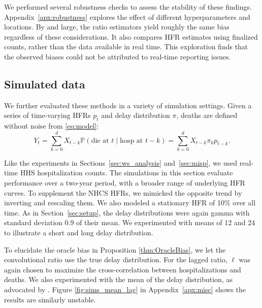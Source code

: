 \documentclass{article}
\newcommand{\given}{\; \vert \;}
\begin{document}
We performed several robustness checks to assess the stability of these findings. Appendix~\ref{apx:robustness} explores the effect of different hyperparameters and locations. By and large, the ratio estimators yield roughly the same bias regardless of these considerations. It also compares HFR estimates using finalized counts, rather than the data available in real time. This exploration finds that the observed biases could not be attributed to real-time reporting issues. 

\subsection{Simulated data}\label{sec:results_sim}

We further evaluated these methods in a variety of simulation settings. Given a series of time-varying HFRs $p_t$ and delay distribution $\pi$, deaths are defined without noise from \eqref{eq:model}:
$$Y_t = \sum_{k=0}^d X_{t-k} \mathbb{P}(\text{die at $t$}\given\text{hosp at }t-k) = \sum_{k=0}^d X_{t-k} \pi_k p_{t-k}.$$

Like the experiments in Sections~\ref{sec:ws_analysis} and~\ref{sec:misp}, we
used real-time HHS hospitalization counts. The simulations in this
section evaluate performance over a two-year period, with a broader range of
underlying HFR curves. To supplement the NHCS HFRs, we mimicked the opposite
trend by inverting and rescaling them. We also modeled a stationary HFR of 10\%
over all time. As in Section~\ref{sec:setup}, the delay distributions were again
gamma with standard deviation 0.9 of their mean. We experimented with means of
12 and 24 to illustrate a short and long delay distribution. 

To elucidate the oracle bias in Proposition \ref{thm:OracleBias}, we let the convolutional ratio use the true delay distribution. For the lagged ratio, $\ell$ was again chosen to maximize the cross-correlation between hospitalizations and deaths. We also experimented with the mean of the delay distribution, as advocated by \citet{lagged_chinese}. Figure \ref{fig:sims_mean_lag} in Appendix~\ref{apx:misc} shows the results are similarly unstable.
\end{document}
